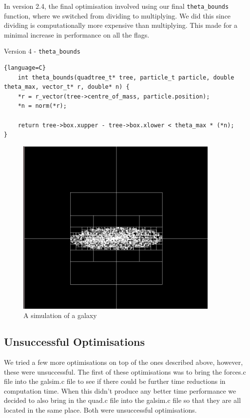 \documentclass{article}
\begin{document}
In version 2.4, the final optimisation involved using our final \verb|theta_bounds| function, where we switched from dividing to multiplying. We did this since dividing is computationally more expensive than multiplying. This made for a minimal increase in performance on all the flags.
\begin{center}
    Version 4 - \verb|theta_bounds|
\end{center}
\begin{lstlisting}{language=C}
    int theta_bounds(quadtree_t* tree, particle_t particle, double theta_max, vector_t* r, double* n) {
    *r = r_vector(tree->centre_of_mass, particle.position);
    *n = norm(*r);

    return tree->box.xupper - tree->box.xlower < theta_max * (*n);
}
\end{lstlisting}
\begin{figure}[htb]
\begin{center}
\includegraphics[width = 10cm]{images/squarespace.png}
\caption{A simulation of a galaxy}
\end{center}
\end{figure}

\newpage
\subsection{Unsuccessful Optimisations}
We tried a few more optimisations on top of the ones described above, however, these were unsuccessful. The first of these optimisations was to bring the forces.c file into the galsim.c file to see if there could be further time reductions in computation time. When this didn't produce any better time performance we decided to also bring in the quad.c file into the galsim.c file so that they are all located in the same place. Both were unsuccessful optimisations.
\newpage
\end{document}
